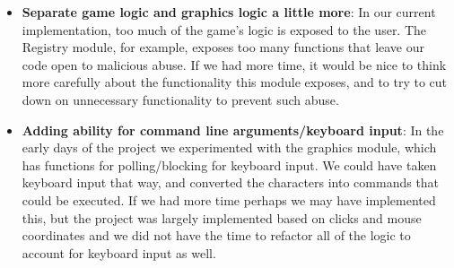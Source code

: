 \documentclass{article}
\begin{document}
\begin{itemize}
    \item \textbf{Separate game logic and graphics logic a little more}: In our current implementation, too much of the game's logic is exposed to the user. The Registry module, for example, exposes too many functions that leave our code open to malicious abuse. If we had more time, it would be nice to think more carefully about the functionality this module exposes, and to try to cut down on unnecessary functionality to prevent such abuse.
    
    \item \textbf{Adding ability for command line arguments/keyboard input}: In the early days of the project we experimented with the graphics module, which has functions for polling/blocking for keyboard input. We could have taken keyboard input that way, and converted the characters into commands that could be executed. If we had more time perhaps we may have implemented this, but the project was largely implemented based on clicks and mouse coordinates and we did not have the time to refactor all of the logic to account for keyboard input as well.  
\end{itemize}
\end{document}
